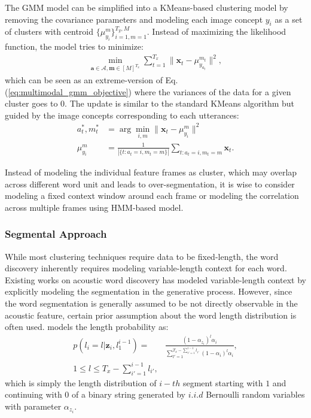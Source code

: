 \documentclass[journal]{IEEEtran}
\begin{document}
The GMM model can be simplified into a KMeans-based clustering model by removing the covariance parameters and modeling each image concept $y_i$ as a set of clusters with centroid $\{\mu_{y_i}^m\}_{i=1, m=1}^{T_y, M}$. Instead of maximizing the likelihood function, the model tries to minimize:
\begin{align}\label{eq:multimodal_kmeans_obj}
    \min_{\mathbf a \in \mathcal A, \mathbf m \in [M]^{T_x}} \sum_{t=1}^{T_x} \|\mathbf x_t - \mu_{y_{a_t}}^{m_t}\|^2,
\end{align}
which can be seen as an extreme-version of Eq. (\ref{eq:multimodal_gmm_objective}) where the variances of the data for a given cluster goes to 0. The update is similar to the standard KMeans algorithm but guided by the image concepts corresponding to each utterances:
\begin{align}\label{eq:multimodal_kmeans_update}
    a_t^*, m_t^* &= \arg\min_{i, m}\|\mathbf x_t - \mu_{y_{i}}^{m}\|^2\\
    \mu_{y_i}^m &= \frac{1}{|\{t: a_t=i, m_t=m\}|}\sum_{t: a_t=i, m_t=m} \mathbf x_t.
\end{align}

Instead of modeling the individual feature frames as cluster, which may overlap across different word unit and leads to over-segmentation, it is wise to consider modeling a fixed context window around each frame or modeling the correlation across multiple frames using HMM-based model.

\subsubsection{Segmental Approach}
While most clustering techniques require data to be fixed-length, the word discovery inherently requires modeling variable-length context for each word. Existing works on acoustic word discovery has modeled variable-length context by explicitly modeling the segmentation in the generative process. However, since the word segmentation is generally assumed to be not directly observable in the acoustic feature, certain prior assumption about the word length distribution is often used. \cite{Lee2012} models the length probability as:
\begin{align}\label{eq:len_prob_seg_hmm}
    p(l_i=l|\mathbf z_i, l_1^{i-1}) = &\frac{(1 - \alpha_{z_i})^l \alpha_i}{\sum_{l'=1}^{T_x - \sum_{i'=1}^{i-1}l_{i'}}(1 - \alpha_i)^l \alpha_i},\\
    1\leq l \leq T_x - \sum_{i'=1}^{i-1}l_{i'},
\end{align}
which is simply the length distribution of $i-th$ segment starting with $1$ and continuing with $0$ of a binary string generated by $i.i.d$ Bernoulli random variables with parameter $\alpha_{z_i}$. 
\end{document}

